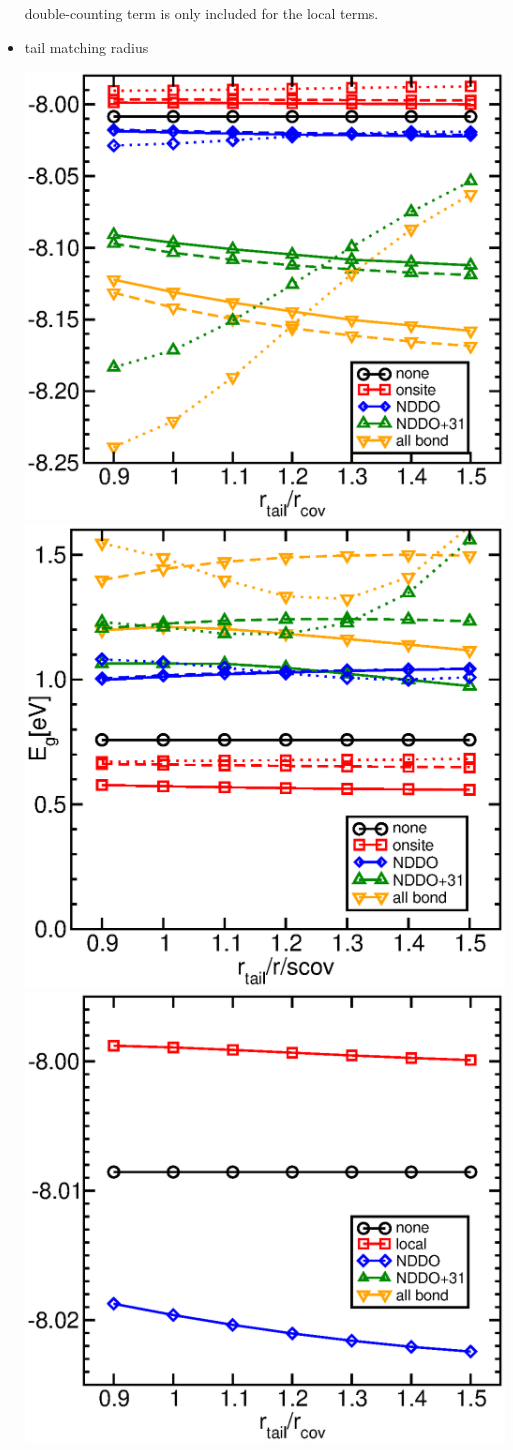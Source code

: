 \documentclass[11pt,a4paper]{report}
\begin{document}
\begin{itemize}
double-counting term is only included for the local terms.
%
\item tail matching radius
\begin{center}
\includegraphics[width=0.4\linewidth,clip=true]{Figs/Eofrtailsi/eofrtail.eps}
\includegraphics[width=0.4\linewidth,clip=true]{Figs/Gapofrtailsi/gapofrtail.eps}
\\
\includegraphics[width=0.4\linewidth,clip=true]
{Figs/Eofrtailsi/eofrtailsi110hr.eps}
\end{center}
\end{itemize}
\end{document}
